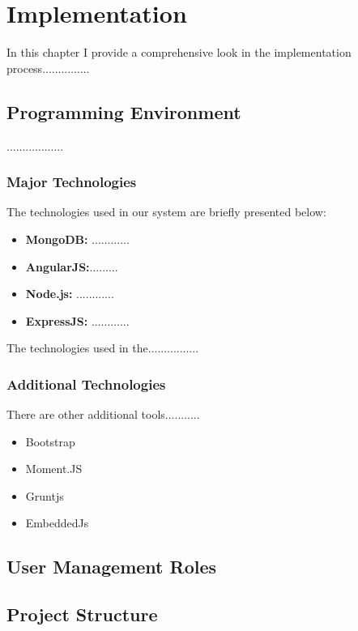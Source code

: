 \chapter{Implementation}
\label{cha:implementation}

In this chapter I provide a comprehensive look in the implementation process...............

\section{Programming Environment}
..................

\subsection{Major Technologies}
The technologies used in our system are briefly presented below:

\begin{itemize}
\item \textbf{MongoDB:} ............

\item \textbf{AngularJS:}.........

\item \textbf{Node.js:} ............

\item \textbf{ExpressJS:} ............


\end{itemize}

The technologies used in the................

\subsection{Additional Technologies}
There are other additional tools...........

\begin{itemize}
\item Bootstrap
\item Moment.JS
\item Gruntjs
\item EmbeddedJs
\end{itemize}

\section{User Management Roles}


\section{Project Structure}



